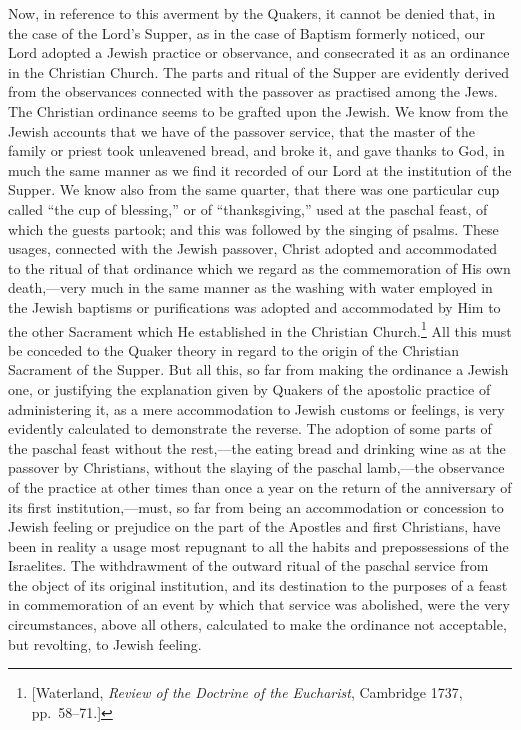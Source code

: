 \documentclass[
  english,
]{book}
\begin{document}
Now, in reference to this averment by the Quakers, it cannot be denied that, in the case of the Lord's Supper, as in the case of Baptism formerly noticed, our Lord adopted a Jewish practice or observance, and consecrated it as an ordinance in the Christian Church. The parts and ritual of the Supper are evidently derived from the observances connected with the passover as practised among the Jews. The Christian ordinance seems to be grafted upon the Jewish. We know from the Jewish accounts that we have of the passover service, that the master of the family or priest took unleavened bread, and broke it, and gave thanks to God, in much the same manner as we find it recorded of our Lord at the institution of the Supper. We know also from the same quarter, that there was one particular cup called ``the cup of blessing,'' or of ``thanksgiving,'' used at the paschal feast, of which the guests partook; and this was followed by the singing of psalms. These usages, connected with the Jewish passover, Christ adopted and accommodated to the ritual of that ordinance which we regard as the commemoration of His own death,---very much in the same manner as the washing with water employed in the Jewish baptisms or purifications was adopted and accommodated by Him to the other Sacrament which He established in the Christian Church.\footnote{{[}Waterland, \emph{Review of the Doctrine of the Eucharist}, Cambridge 1737, pp.~58--71.{]}} All this must be conceded to the Quaker theory in regard to the origin of the Christian Sacrament of the Supper. But all this, so far from making the ordinance a Jewish one, or justifying the explanation given by Quakers of the apostolic practice of administering it, as a mere accommodation to Jewish customs or feelings, is very evidently calculated to demonstrate the reverse. The adoption of some parts of the paschal feast without the rest,---the eating bread and drinking wine as at the passover by Christians, without the slaying of the paschal lamb,---the observance of the practice at other times than once a year on the return of the anniversary of its first institution,---must, so far from being an accommodation or concession to Jewish feeling or prejudice on the part of the Apostles and first Christians, have been in reality a usage most repugnant to all the habits and prepossessions of the Israelites. The withdrawment of the outward ritual of the paschal service from the object of its original institution, and its destination to the purposes of a feast in commemoration of an event by which that service was abolished, were the very circumstances, above all others, calculated to make the ordinance not acceptable, but revolting, to Jewish feeling.
\end{document}
